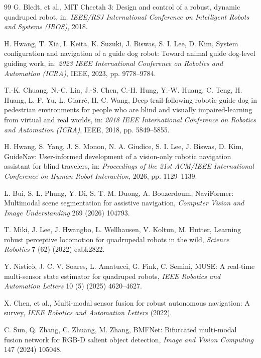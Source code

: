 \documentclass[11pt, a4paper]{article}
\begin{document}
{{{\begin{thebibliography}{99}
G. Bledt, et al., MIT Cheetah 3: Design and control of a robust, dynamic quadruped robot, in: \textit{IEEE/RSJ International Conference on Intelligent Robots and Systems (IROS)}, 2018.

H. Hwang, T. Xia, I. Keita, K. Suzuki, J. Biswas, S. I. Lee, D. Kim, System configuration and navigation of a guide dog robot: Toward animal guide dog-level guiding work, in: \textit{2023 IEEE International Conference on Robotics and Automation (ICRA)}, IEEE, 2023, pp. 9778--9784.

T.-K. Chuang, N.-C. Lin, J.-S. Chen, C.-H. Hung, Y.-W. Huang, C. Teng, H. Huang, L.-F. Yu, L. Giarr\'e, H.-C. Wang, Deep trail-following robotic guide dog in pedestrian environments for people who are blind and visually impaired-learning from virtual and real worlds, in: \textit{2018 IEEE International Conference on Robotics and Automation (ICRA)}, IEEE, 2018, pp. 5849--5855.

H. Hwang, S. Yang, J. S. Monon, N. A. Giudice, S. I. Lee, J. Biswas, D. Kim, GuideNav: User-informed development of a vision-only robotic navigation assistant for blind travelers, in: \textit{Proceedings of the 21st ACM/IEEE International Conference on Human-Robot Interaction}, 2026, pp. 1129--1139.

L. Bui, S. L. Phung, Y. Di, S. T. M. Duong, A. Bouzerdoum, NaviFormer: Multimodal scene segmentation for assistive navigation, \textit{Computer Vision and Image Understanding} 269 (2026) 104793.

T. Miki, J. Lee, J. Hwangbo, L. Wellhausen, V. Koltun, M. Hutter, Learning robust perceptive locomotion for quadrupedal robots in the wild, \textit{Science Robotics} 7 (62) (2022) eabk2822.

Y. Nistic\`o, J. C. V. Soares, L. Amatucci, G. Fink, C. Semini, MUSE: A real-time multi-sensor state estimator for quadruped robots, \textit{IEEE Robotics and Automation Letters} 10 (5) (2025) 4620--4627.

X. Chen, et al., Multi-modal sensor fusion for robust autonomous navigation: A survey, \textit{IEEE Robotics and Automation Letters} (2022).

C. Sun, Q. Zhang, C. Zhuang, M. Zhang, BMFNet: Bifurcated multi-modal fusion network for RGB-D salient object detection, \textit{Image and Vision Computing} 147 (2024) 105048.


\end{thebibliography}}}}
\end{document}
